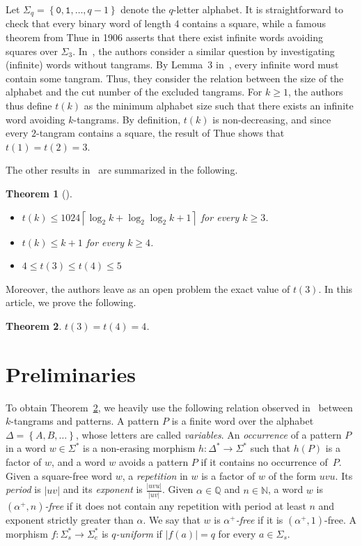 \documentclass[final]{dmtcs-episciences}
\def\acc#1{\left\{ #1 \right\}}
\def\ceil#1{\left\lceil #1 \right\rceil}
\renewcommand{\le}{\leqslant}
\renewcommand{\ge}{\geqslant}
\theoremstyle{plain}
\newtheorem{theorem}{Theorem}
\theoremstyle{definition}
\theoremstyle{remark}
\begin{document}
Let $\Sigma_q=\acc{\texttt{0},\texttt{1},\ldots, q-1}$ denote the $q$-letter alphabet.
It is straightforward to check that every binary word of length 4 contains a square, while a famous theorem from Thue in 1906 asserts that there exist infinite words avoiding squares over $\Sigma_3$.
In~\cite{Debski(2024)}, the authors consider a similar question by investigating (infinite) words without tangrams.
By Lemma~3 in~\cite{Rampersad(2011)}, every infinite word must contain some tangram.
Thus, they consider the relation between the size of the alphabet and the cut number of the excluded tangrams.
For $k\ge1$, the authors thus define $t(k)$ as the minimum alphabet size such that there exists an infinite word 
avoiding $k$-tangrams. By definition, $t(k)$ is non-decreasing, and since every $2$-tangram contains a square, the result of Thue shows that $t(1)=t(2)=3$.

The other results in~\cite{Debski(2024)} are summarized in the following. 

\begin{theorem}[\cite{Debski(2024)}]\ 
\begin{itemize}
\item $t(k)\le1024\ceil{\log_2 k+\log_2 \log_2 k+1}$ for every $k\ge3$.
\item $t(k)\le k+1$ for every $k\ge4$.
\item $4\le t(3)\le t(4)\le5$
\end{itemize}
\end{theorem}
Moreover, the authors leave as an open problem the exact value of $t(3)$. In this article, we prove the following. 
\begin{theorem}
\label{thm:main}
$t(3)=t(4)=4$.
\end{theorem}

\section{Preliminaries}
To obtain Theorem~\ref{thm:main}, we heavily use the following relation observed in~\cite{Debski(2024)} between $k$-tangrams and patterns.
A pattern $P$ is a finite word over the alphabet $\Delta=\acc{A,B,\dots}$, whose letters are called \emph{variables}.
An \emph{occurrence} of a pattern $P$ in a word $w\in\Sigma^*$ is a non-erasing morphism $h:\Delta^*\to\Sigma^*$ such that $h(P)$ is a factor of $w$,
and a word $w$ avoids a pattern $P$ if it contains no occurrence of~$P$.
Given a square-free word $w$, a \emph{repetition} in $w$ is a factor of $w$ of the form $uvu$.
Its \emph{period} is $|uv|$ and its \emph{exponent} is $\tfrac{|uvu|}{|uv|}$.
Given $\alpha\in\mathbb{Q}$ and $n\in\mathbb{N}$, a word $w$ is \emph{$(\alpha^+,n)$-free} if it does not contain any repetition with period at least $n$ and exponent strictly greater than $\alpha$.
We say that $w$ is \emph{$\alpha^+$-free} if it is $(\alpha^+,1)$-free. 
A morphism $f:\Sigma_s^*\rightarrow\Sigma_e^*$ is \emph{$q$-uniform} if $|f(a)|=q$ for every $a\in\Sigma_s$.
\end{document}
